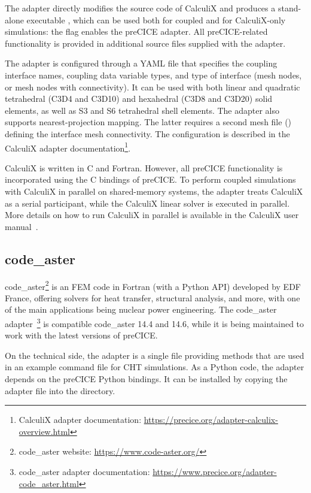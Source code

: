 The adapter directly modifies the source code of CalculiX and produces a stand-alone executable , which can be used both for coupled and for CalculiX-only simulations: the flag  enables the preCICE adapter. All preCICE-related functionality is provided in additional source files supplied with the adapter.

The adapter is configured through a YAML file that specifies the coupling interface names, coupling data variable types, and type of interface (mesh nodes, or mesh nodes with connectivity).
 It can be used with both linear and quadratic tetrahedral (C3D4 and C3D10) and hexahedral (C3D8 and C3D20) solid elements, as well as S3 and S6 tetrahedral shell elements. The adapter also supports nearest-projection mapping. The latter requires a second mesh file () defining the interface mesh connectivity. The configuration is described in the CalculiX adapter documentation\footnote{CalculiX adapter documentation: \url{https://precice.org/adapter-calculix-overview.html}}.

CalculiX is written in C and Fortran. However, all preCICE functionality is incorporated using the C bindings of preCICE. To perform coupled simulations with CalculiX in parallel on shared-memory systems, the adapter treats CalculiX as a serial participant, while the CalculiX linear solver is executed in parallel. More details on how to run CalculiX in parallel is available in the CalculiX user manual~\cite{CalculiX_docs_217}.

\subsection{code\_aster}

code\_aster\footnote{code\_aster website: \url{https://www.code-aster.org/}} is an FEM code in Fortran (with a Python API) developed by EDF France,
offering solvers for heat transfer, structural analysis, and more, with one of the main applications being nuclear power engineering.
The code\_aster adapter~\cite{CheungYau2016}\footnote{code\_aster adapter documentation: \url{https://www.precice.org/adapter-code_aster.html}}
is compatible code\_aster 14.4 and 14.6, while it is being maintained to work with the latest versions of preCICE.

On the technical side, the adapter is a single  file providing methods that are used in an example
 command file for CHT simulations. As a Python code, the adapter depends on the preCICE Python bindings. It can be installed by copying the adapter file into the  directory.


